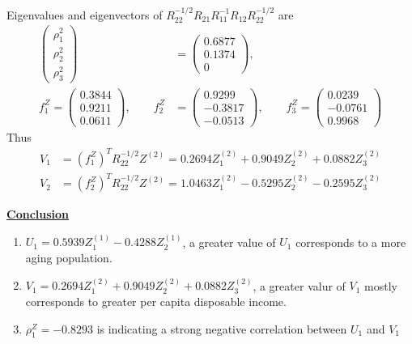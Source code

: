 \documentclass[12pt]{extarticle}
\newcommand{\<}{\langle}
\renewcommand{\>}{\rangle}
\theoremstyle{definition}
\begin{document}
\begin{tcolorbox}[enhanced, drop fuzzy shadow, title=Example 10.1 (Cont.)]
Eigenvalues and eigenvectors of $R_{22}^{-1/2}R_{21}R_{11}^{-1}R_{12}R_{22}^{-1/2}$ are
\begin{align*}
    \left(\begin{array}{c}
        \rho_1^2 \\
        \rho_2^2 \\
        \rho_3^2
        \end{array} \right) &= \left(\begin{array}{c}
        0.6877 \\
        0.1374 \\
        0
        \end{array} \right), \\
        f_1^Z = \left(\begin{array}{c}
        0.3844 \\
        0.9211 \\
        0.0611
        \end{array} \right), \qquad
        f_2^Z &= \left(\begin{array}{c}
        0.9299 \\
        -0.3817 \\
        -0.0513
        \end{array} \right), \qquad
        f_3^Z = \left(\begin{array}{c}
        0.0239 \\
        -0.0761 \\
        0.9968
        \end{array} \right)
\end{align*}
Thus
\begin{align*}
    V_1 &= (f_1^Z)^T R_{22}^{-1/2}Z^{(2)} = 0.2694Z_1^{(2)} +0.9049Z_2^{(2)} +0.0882Z_3^{(2)}\\
    V_2 &= (f_2^Z)^T R_{22}^{-1/2}Z^{(2)} = 1.0463Z_1^{(2)} - 0.5295Z_2^{(2)} -0.2595Z_3^{(2)}
\end{align*}

\underline{\textbf{Conclusion}}
\begin{enumerate}
    \item $U_1 = 0.5939Z_1^{(1)} -0.4288Z_2^{(1)}$, a greater value of $U_1$ corresponds to a more aging population.
    \item $V_1 = 0.2694Z_1^{(2)} +0.9049Z_2^{(2)} +0.0882Z_3^{(2)}$, a greater valur of $V_1$ mostly corresponds to greater per capita disposable income.
    \item $\rho^Z_1 = -0.8293$ is indicating a strong negative correlation between $U_1$ and $V_1$
\end{enumerate}
\end{tcolorbox}
\end{document}
